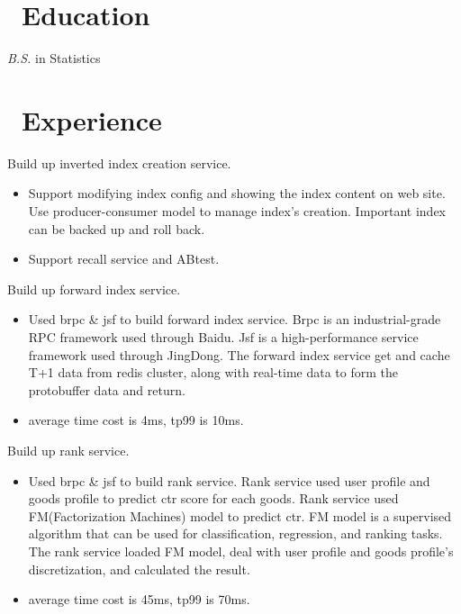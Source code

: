 \documentclass{resume}
\begin{document}



\section{\faGraduationCap\ Education}
\textit{B.S.} in Statistics

\section{\faUsers\ Experience}
Build up inverted index creation service.
\begin{itemize}
  \item Support modifying index config and showing the index content on web site. Use producer-consumer model to manage index's creation. Important index can be backed up and roll back.
  \item Support recall service and ABtest.
\end{itemize}
Build up forward index service.
\begin{itemize}
  \item Used brpc & jsf to build forward index service. Brpc is an industrial-grade RPC framework used through Baidu. Jsf is a high-performance service framework used through JingDong. The forward index service get and cache T+1 data from redis cluster, along with real-time data to form the protobuffer data and return.
  \item average time cost is 4ms, tp99 is 10ms.
\end{itemize}
Build up rank service.
\begin{itemize}
  \item Used brpc & jsf to build rank service. Rank service used user profile and goods profile to predict ctr score for each goods. Rank service used FM(Factorization Machines) model to predict ctr. FM model is a supervised algorithm that can be used for classification, regression, and ranking tasks. The rank service loaded FM model, deal with user profile and goods profile's discretization, and calculated the result.
  \item average time cost is 45ms, tp99 is 70ms.
\end{itemize}
\end{document}
